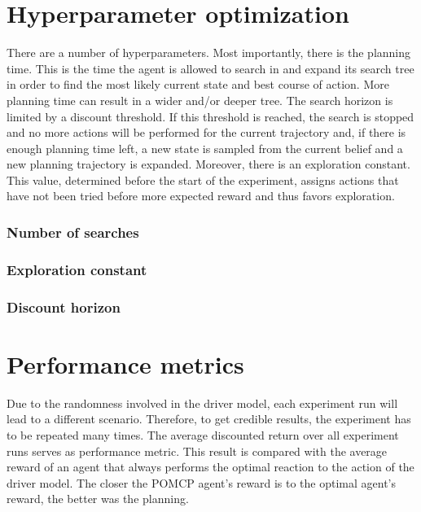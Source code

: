 \section{Hyperparameter optimization}
There are a number of hyperparameters. Most importantly, there is the planning time. This is the time the agent is allowed to search in and expand its search tree in order to find the most likely current state and best course of action. More planning time can result in a wider and/or deeper tree. The search horizon is limited by a discount threshold. If this threshold is reached, the search is stopped and no more actions will be performed for the current trajectory and, if there is enough planning time left, a new state is sampled from the current belief and a new planning trajectory is expanded. Moreover, there is an exploration constant. This value, determined before the start of the experiment, assigns actions that have not been tried before more expected reward and thus favors exploration.
\subsubsection{Number of searches}
\subsubsection{Exploration constant}
\subsubsection{Discount horizon}

\section{Performance metrics}
Due to the randomness involved in the driver model, each experiment run will lead to a different scenario. Therefore, to get credible results, the experiment has to be repeated many times. The average discounted return over all experiment runs serves as performance metric. This result is compared with the average reward of an agent that always performs the optimal reaction to the action of the driver model. The closer the POMCP agent's reward is to the optimal agent's reward, the better was the planning.

